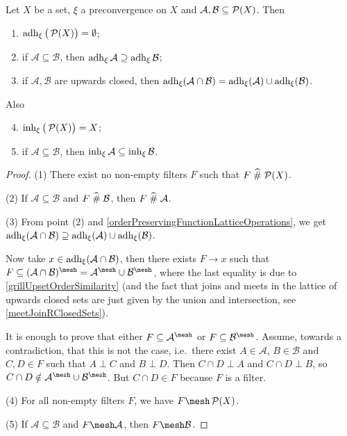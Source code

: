 \begin{proposition}
Let $X$ be a set, $\xi$ a preconvergence on $X$ and $\mathcal{A},\mathcal{B} \subseteq \operatorname{\mathcal{P}}(X)$. Then
\begin{enumerate}
\item $\operatorname{adh}_\xi \big(\operatorname{\mathcal{P}}(X)\big) = \emptyset$;
\item if $\mathcal{A} \subseteq \mathcal{B}$, then $\operatorname{adh}_\xi \mathcal{A} \supseteq \operatorname{adh}_\xi \mathcal{B}$;
\item if $\mathcal{A},\mathcal{B}$ are upwards closed, then $\operatorname{adh}_\xi(\mathcal{A}\cap \mathcal{B}) = \operatorname{adh}_\xi(\mathcal{A}) \cup \operatorname{adh}_\xi(\mathcal{B})$.
\end{enumerate}
Also
\begin{enumerate} \setcounter{enumi}{3}
\item $\operatorname{inh}_\xi\big(\operatorname{\mathcal{P}}(X)\big) = X$;
\item if $\mathcal{A} \subseteq \mathcal{B}$, then $\operatorname{inh}_\xi \mathcal{A} \subseteq \operatorname{inh}_\xi \mathcal{B}$.
\end{enumerate}
\end{proposition}
\begin{proof}
(1) There exist no non-empty filters $F$ such that $F\mathrel{\widehat{\#}} \operatorname{\mathcal{P}}(X)$.

(2) If $\mathcal{A} \subseteq \mathcal{B}$ and $F\mathrel{\widehat{\#}} \mathcal{B}$, then $F\mathrel{\widehat{\#}} \mathcal{A}$.

(3) From point (2) and \ref{orderPreservingFunctionLatticeOperations}, we get $\operatorname{adh}_\xi(\mathcal{A}\cap \mathcal{B}) \supseteq \operatorname{adh}_\xi(\mathcal{A}) \cup \operatorname{adh}_\xi(\mathcal{B})$.

Now take $x\in\operatorname{adh}_\xi(\mathcal{A}\cap \mathcal{B})$, then there exists $F\to x$ such that $F\subseteq (\mathcal{A}\cap \mathcal{B})^\mesh = \mathcal{A}^\mesh\cup \mathcal{B}^\mesh$, where the last equality is due to \ref{grillUpsetOrderSimilarity} (and the fact that joins and meets in the lattice of upwards closed sets are just given by the union and intersection, see \ref{meetJoinRClosedSets}).

It is enough to prove that either $F\subseteq \mathcal{A}^\mesh$ or $F\subseteq \mathcal{B}^\mesh$. Assume, towards a contradiction, that this is not the case, i.e.\ there exist $A\in\mathcal{A}$, $B\in \mathcal{B}$ and $C,D\in F$ such that $A\perp C$ and $B\perp D$. Then $C\cap D\perp A$ and $C\cap D \perp B$, so $C\cap D \notin \mathcal{A}^\mesh\cup \mathcal{B}^\mesh$. But $C\cap D \in F$ because $F$ is a filter.

(4) For all non-empty filters $F$, we have $F\mesh \powerset(X)$.

(5) If $\mathcal{A} \subseteq \mathcal{B}$ and $F\mesh \mathcal{A}$, then $F\mesh \mathcal{B}$.
\end{proof}
